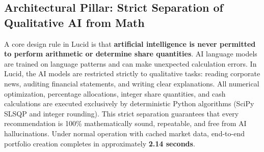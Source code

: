 \subsection{Architectural Pillar: Strict Separation of Qualitative AI from Math}
A core design rule in Lucid is that \textbf{artificial intelligence is never permitted to perform arithmetic or determine share quantities}. AI language models are trained on language patterns and can make unexpected calculation errors. In Lucid, the AI models are restricted strictly to qualitative tasks: reading corporate news, auditing financial statements, and writing clear explanations. All numerical optimization, percentage allocations, integer share quantities, and cash calculations are executed exclusively by deterministic Python algorithms (SciPy SLSQP and integer rounding). This strict separation guarantees that every recommendation is 100\% mathematically sound, repeatable, and free from AI hallucinations. Under normal operation with cached market data, end-to-end portfolio creation completes in approximately \textbf{2.14 seconds}.

